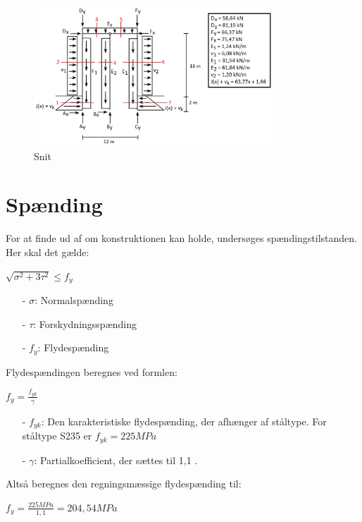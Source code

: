 \begin{figure}[H]
	\centering
	\includegraphics[width=0.8\textwidth]{billeder/snitbrud.png}
	\caption{Snit}
	\label{fig:snitbrud}
\end{figure}

\section{Spænding}
For at finde ud af om konstruktionen kan holde, undersøges spændingstilstanden. Her skal det gælde:

\begin{center}
	$\sqrt{\sigma^2 + 3\tau^2} \leq f_y$ 
\end{center}

\begin{itemize}
	\item[-] $\sigma$: Normalspænding
	\item[-] $\tau$: Forskydningsspænding
	\item[-] $f_y$: Flydespænding
\end{itemize}

Flydespændingen beregnes ved formlen:

\begin{center}
	$f_y = \frac{f_{yk}}{\gamma}$
\end{center}

\begin{itemize}
	\item[-] $f_{yk}$: Den karakteristiske flydespænding, der afhænger af ståltype. For ståltype S235 er $f_{yk} = 225 MPa$
	\item[-] $\gamma$: Partialkoefficient, der sættes til 1,1 \citep[ s. 212]{stabi}.  
\end{itemize}

Altså beregnes den regningsmæssige flydespænding til:

\begin{center}
	$f_y = \frac{225 MPa}{1,\!1} = 204,\!54 MPa$
\end{center}

